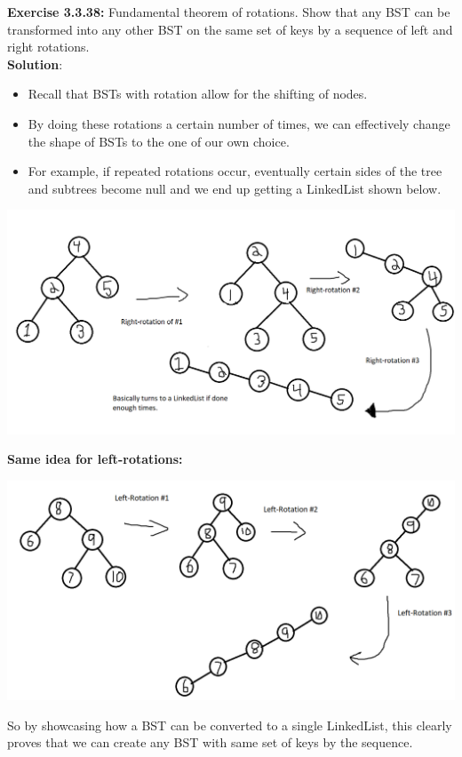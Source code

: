 \documentclass[11pt,fleqn]{article}
\begin{document}
\textbf{Exercise 3.3.38:} Fundamental theorem of rotations. Show that any BST can be transformed into
any other BST on the same set of keys by a sequence of left and right rotations.\\

\textbf{Solution}:

\begin{itemize}
	\item Recall that BSTs with rotation allow for the shifting of nodes.
	
	\item By doing these rotations a certain number of times, we can effectively change the shape of BSTs to the one of our own choice.
	
	\item For example, if repeated rotations occur, eventually certain sides of the tree and subtrees become null and we end up getting a LinkedList shown below.
\end{itemize}

\begin{center}
	\includegraphics[scale=.45]{3.3.38.png}
\end{center}

\newpage
\textbf{Same idea for left-rotations:}
\begin{center}
	\includegraphics[scale=.5]{3.3.38-1.png}
\end{center}

So by showcasing how a BST can be converted to a single LinkedList, this clearly proves that we can create any BST with same set of keys by the sequence.
\end{document}
